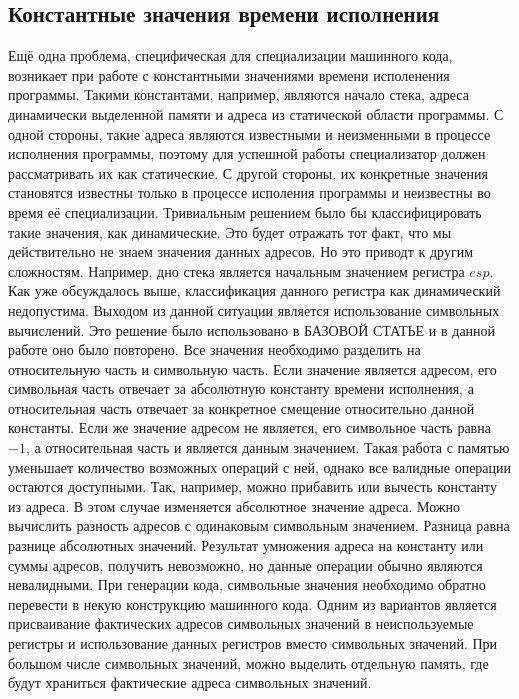 \documentclass{spbau-diploma}
\begin{document}
\subsection{ Константные значения времени исполнения}
Ещё одна проблема, специфическая для специализации машинного кода, возникает при работе с константными значениями времени исполенения программы. Такими константами, например, являются начало стека, адреса динамически выделенной памяти и адреса из статической области программы. С одной стороны, такие адреса являются известными и неизменными в процессе исполнения программы, поэтому для успешной работы специализатор должен рассматривать их как статические. С другой стороны, их конкретные значения становятся известны только в процессе исполения программы и неизвестны во время её специализации.  Тривиальным решением было бы классифицировать такие значения, как динамические. Это будет отражать тот факт, что мы действительно не знаем значения данных адресов. Но это приводт к другим сложностям. Например, дно стека является начальным значением регистра $esp$. Как уже обсуждалось выше, классификация данного регистра как динамический недопустима. Выходом из данной ситуации является использование символьных вычислений. Это решение было использовано в {\LARGE БАЗОВОЙ СТАТЬЕ} и в данной работе оно было повторено. Все значения необходимо разделить на относительную часть и символьную часть. Если значение является адресом, его символьная часть отвечает за абсолютную константу времени исполнения, а относительная часть отвечает за конкретное смещение относительно данной константы. Если же значение адресом не является, его символьное часть равна $-1$, а относительная часть и является данным значением. Такая работа с памятью уменьшает количество возможных операций с ней, однако все валидные операции остаются доступными. Так, например, можно прибавить или вычесть константу из адреса. В этом случае изменяется абсолютное значение адреса. Можно вычислить разность адресов с одинаковым символьным значением. Разница равна разнице абсолютных значений. Результат умножения адреса на константу или суммы адресов, получить невозможно, но данные операции обычно являются невалидными. При генерации кода, символьные значения необходимо обратно перевести в некую конструкцию машинного кода. Одним из вариантов является присваивание фактических адресов символьных значений в неиспользуемые регистры и использование данных регистров вместо символьных значений. При большом числе символьных значений, можно выделить отдельную память, где будут храниться фактические адреса символьных значений.
\end{document}
